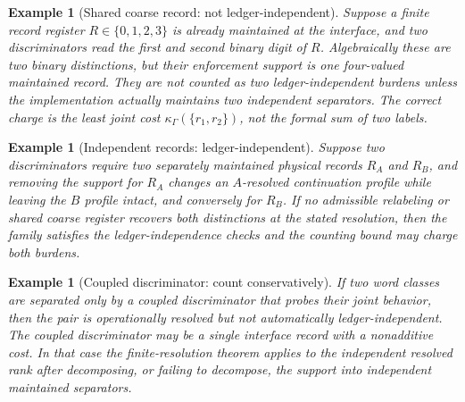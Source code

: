 \documentclass[11pt]{article}
\newtheorem{example}[theorem]{Example}
\begin{document}
\begin{example}[Shared coarse record: not ledger-independent]\label{ex:shared-coarse-record}
Suppose a finite record register $R\in\{0,1,2,3\}$ is already maintained at the interface, and two discriminators read the first and second binary digit of $R$.  Algebraically these are two binary distinctions, but their enforcement support is one four-valued maintained record.  They are not counted as two ledger-independent burdens unless the implementation actually maintains two independent separators.  The correct charge is the least joint cost $\kappa_\Gamma(\{r_1,r_2\})$, not the formal sum of two labels.
\end{example}

\begin{example}[Independent records: ledger-independent]\label{ex:independent-records}
Suppose two discriminators require two separately maintained physical records $R_A$ and $R_B$, and removing the support for $R_A$ changes an $A$-resolved continuation profile while leaving the $B$ profile intact, and conversely for $R_B$.  If no admissible relabeling or shared coarse register recovers both distinctions at the stated resolution, then the family satisfies the ledger-independence checks and the counting bound may charge both burdens.
\end{example}

\begin{example}[Coupled discriminator: count conservatively]\label{ex:coupled-discriminator}
If two word classes are separated only by a coupled discriminator that probes their joint behavior, then the pair is operationally resolved but not automatically ledger-independent.  The coupled discriminator may be a single interface record with a nonadditive cost.  In that case the finite-resolution theorem applies to the independent resolved rank after decomposing, or failing to decompose, the support into independent maintained separators.
\end{example}
\end{document}
